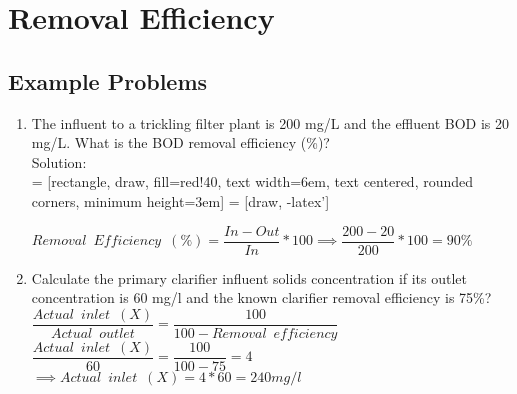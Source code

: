 \documentclass{article}
\begin{document}
\section{Removal Efficiency}

\subsection{Example Problems} 

\begin{enumerate}

\item The influent to a trickling filter plant is 200 mg/L and the effluent BOD is 20 mg/L. What is the BOD removal efficiency (\%)?\\
Solution:\\
\vspace{0.3cm}
 = [rectangle, draw, fill=red!40, 
    text width=6em, text centered, rounded corners, minimum height=3em]
 = [draw, -latex']
\begin{figure}[!h]
\centering
{}
\end{figure}
\vspace{0.5cm}
$Removal \enspace Efficiency \enspace (\%) = \dfrac{In-Out}{In}*100 \implies \dfrac{200-20}{200}*100=\boxed{90\%}$




\item Calculate the primary clarifier influent solids concentration if its outlet concentration is 60 mg/l and the known clarifier removal efficiency is 75\%?\\
$\dfrac{Actual \enspace  inlet \enspace (X)}{Actual \enspace outlet}=\dfrac{100}{100-Removal \enspace efficiency}$\\ 
$\dfrac{Actual \enspace  inlet \enspace (X)}{60}=\dfrac{100}{100-75}=4$\\
$\implies Actual \enspace inlet \enspace (X)=4*60 = \boxed{240 mg/l}$\\


\end{enumerate}
\end{document}
